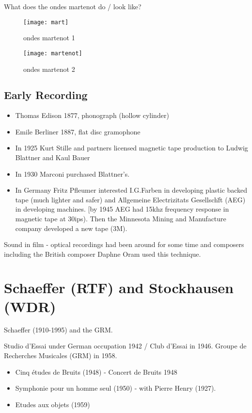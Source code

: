 What does the ondes martenot do / look like?

\begin{figure}[H]
\centering
\texttt{[image: mart]}\caption{ondes martenot 1}
\label{fig:worldfair}
\end{figure}

\begin{figure}[H]
\centering
\texttt{[image: martenot]}\caption{ondes martenot 2}
\label{fig:worldfair}
\end{figure}

\subsection{Early Recording}
\begin{itemize}
\item Thomas Edison 1877, phonograph (hollow cylinder)
\item Emile Berliner 1887, flat disc gramophone
\item In 1925 Kurt Stille and partners licensed magnetic tape production to Ludwig Blattner and Kaul Bauer
\item In 1930 Marconi purchased Blattner's.
\item In Germany Fritz Pfleumer interested I.G.Farben in developing plastic backed tape (much lighter and safer) and Allgemeine Electrizitats Gesellsch\"ft (AEG) in developing machines. [by 1945 AEG had 15khz frequency response in magnetic tape at 30ips). Then the Minnesota Mining and Manufacture company developed a new tape (3M).
\end{itemize}

Sound in film - optical recordings had been around for some time and composers including the British composer Daphne Oram used this technique.

\section{Schaeffer (RTF) and Stockhausen (WDR)}

Schaeffer (1910-1995) and the GRM.

Studio d'Essai under German occupation 1942 / Club d'Essai in 1946. Groupe de Recherches Musicales (GRM) in 1958.

\begin{itemize}
\item Cinq \'etudes de Bruits (1948) - Concert de Bruits 1948
\item Symphonie pour un homme seul (1950) - with Pierre Henry (1927).
\item Etudes aux objets (1959)
\end{itemize}

